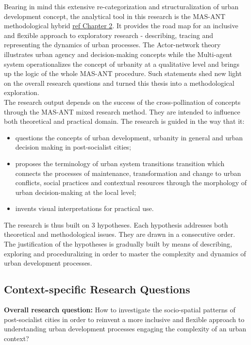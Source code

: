 \documentclass[11pt]{report}
\begin{document}
Bearing in mind this extensive re-categorization and structuralization of urban development concept, the analytical tool in this research is the MAS-ANT methodological hybrid \href{}{ref Chapter 2}. 
It provides the road map for an inclusive and flexible approach to exploratory research - describing, tracing and representing the dynamics of urban processes.
The Actor-network theory illustrates urban agency and decision-making concepts while the Multi-agent system operationalizes the concept of urbanity at a qualitative level and brings up the logic of the whole MAS-ANT procedure. Such statements shed new light on the overall research questions and turned this thesis into a methodological exploration.
\\
The research output depends on the success of the cross-pollination of concepts through the MAS-ANT mixed research method. They are intended to influence both theoretical and practical domain. The research is guided in the way that it:
\begin{itemize}
\item questions the concepts of urban development, urbanity in general and urban decision making in post-socialist cities;
\item proposes the terminology of urban system transitions transition which connects the processes of maintenance, transformation and change to urban conflicts, social practices and contextual resources through the morphology of urban decision-making at the local level;
\item invents visual interpretations for practical use.
\end{itemize}

The research is thus built on 3 hypotheses. Each hypothesis addresses both theoretical and methodological issues. They are drawn in a consecutive order. The justification of the hypotheses is gradually built by means of describing, exploring and proceduralizing in order to master the complexity and dynamics of urban development processes. 

\subsection{Context-specific Research Questions}

\textbf{Overall research question:} How to investigate the socio-spatial patterns of post-socialist cities in order to reinvent a more inclusive and flexible approach to understanding urban development processes engaging the complexity of an urban context? 
\end{document}
